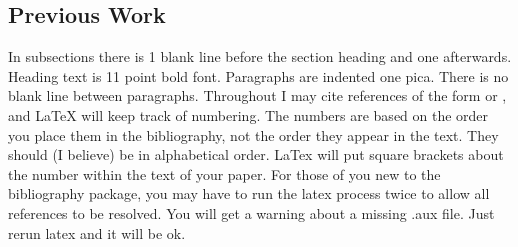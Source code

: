 \subsection{Previous Work}
In subsections there is 1 blank line before the section 
heading and one afterwards.  Heading text is 11 point 
bold font.  Paragraphs are indented one pica.  There is 
no blank line between paragraphs.
Throughout I may cite references of the form 
\cite{key:foo} or \cite{foo:baz}, and LaTeX will keep 
track of numbering.  The numbers are based on the order 
you place them in the bibliography, not the order they 
appear in the text.  They should (I believe) be in 
alphabetical order.  LaTex will put square brackets about 
the number within the text of your paper.  For those of 
you new to the bibliography package, you may have to run 
the latex process twice to allow all references to be 
resolved. You will get a warning about a missing .aux 
file.  Just rerun latex and it will be ok.

